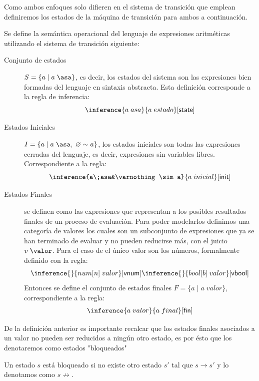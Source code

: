     Como ambos enfoques solo difieren en el sistema de transición que emplean definiremos los estados de la máquina de transición para ambos a continuación.

    \bigskip
    
    \begin{definition}\label{sistemaT} Se define la semántica operacional del lenguaje de expresiones aritméticas utilizando el sistema de transición siguiente:
    \vspace{1em}
        \begin{description}
            \item[Conjunto de estados] $S=\{a\;|\;a\;\asa\}$, es decir, los estados del sistema son las expresiones bien formadas del lenguaje en sintaxis abstracta. Esta definición corresponde a la regla de inferencia:
            $$\inference{a\;asa}{a\;estado}[\sf state]$$  \bigskip
            \item[Estados Iniciales] $I=\{a\;|\;a\;\asa,\;\varnothing\sim a\}$, los estados iniciales son todas las expresiones cerradas del lenguaje, es decir, expresiones sin variables libres. Correspondiente a la regla:
            $$\inference{a\;asa&\varnothing\sim a}{a\;inicial}[\sf init]$$ \biskip
            \item[Estados Finales] se definen como las expresiones que representan a los posibles resultados finales de un proceso de evaluación. Para poder modelarlos definimos una categoría de valores los cuales son un subconjunto de expresiones que ya se han terminado de evaluar y no pueden reducirse más, con el juicio $v\;\valor$. Para el caso de \ea el único valor son los números, formalmente definido con la regla:
            $$\inference{}{num[n]\;valor}[\sf vnum]\inference{}{bool[b]\;valor}[\sf vbool]$$
            Entonces se define el conjunto de estados finales $F=\{a\;|\;a\;valor\}$, correspondiente a la regla:
            $$\inference{a\;valor}{a\;final}[\sf fin]$$ 

        \end{description}
    \end{definition}

    De la definición anterior es importante recalcar que los estados finales asociados a un valor no pueden ser reducidos a ningún otro estado, es por ésto que los denotaremos como estados "bloqueados"

    \begin{definition} Un estado $s$ está bloqueado si no existe otro estado $s'$ tal que $s\to s'$ y lo denotamos como $s\not\to$.
    \end{definition}

